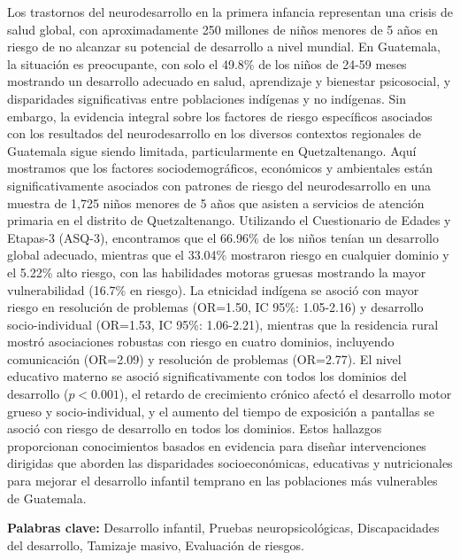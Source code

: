Los trastornos del neurodesarrollo en la primera infancia representan una 
crisis de salud global, con aproximadamente 250 millones de niños menores de 5 
años en riesgo de no alcanzar su potencial de desarrollo a nivel mundial. En 
Guatemala, la situación es preocupante, con solo el 49.8\% de los 
niños de 24-59 meses mostrando un desarrollo adecuado en salud, aprendizaje y 
bienestar psicosocial, y disparidades significativas entre poblaciones 
indígenas y no indígenas. Sin embargo, la evidencia integral sobre los factores 
de riesgo específicos asociados con los resultados del neurodesarrollo en los 
diversos contextos regionales de Guatemala sigue siendo limitada, 
particularmente en Quetzaltenango. Aquí mostramos que los 
factores sociodemográficos, económicos y ambientales están significativamente 
asociados con patrones de riesgo del neurodesarrollo en una muestra de 1,725 
niños menores de 5 años que asisten a servicios de atención primaria en el 
distrito de Quetzaltenango. Utilizando el Cuestionario de Edades y Etapas-3 
(ASQ-3), encontramos que el 66.96\% de los niños tenían un desarrollo global 
adecuado, mientras que el 33.04\% mostraron riesgo en cualquier dominio y el 
5.22\% alto riesgo, con las habilidades motoras gruesas mostrando la mayor 
vulnerabilidad (16.7\% en riesgo). La etnicidad indígena se asoció con mayor 
riesgo en resolución de problemas (OR=1.50, IC 95\%: 1.05-2.16) y desarrollo 
socio-individual (OR=1.53, IC 95\%: 1.06-2.21), mientras que la residencia 
rural mostró asociaciones robustas con riesgo en cuatro dominios, incluyendo 
comunicación (OR=2.09) y resolución de problemas (OR=2.77). El nivel educativo 
materno se asoció significativamente con todos los dominios del desarrollo 
($p<0.001$), el retardo de crecimiento crónico afectó el desarrollo motor 
grueso y socio-individual, y el aumento del tiempo de exposición a pantallas 
se asoció con riesgo de desarrollo en todos los dominios. Estos hallazgos 
proporcionan conocimientos basados en evidencia para diseñar intervenciones 
dirigidas que aborden las disparidades socioeconómicas, educativas y
nutricionales  para mejorar el desarrollo infantil temprano en las poblaciones
más  vulnerables de Guatemala.

\textbf{Palabras clave:} Desarrollo infantil, Pruebas neuropsicológicas, 
Discapacidades del desarrollo, Tamizaje masivo, Evaluación de riesgos.

\newpage
